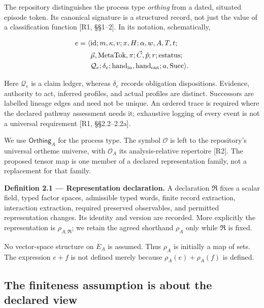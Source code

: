 \documentclass[11pt,a4paper]{article}
\begin{document}
The repository distinguishes the process type \emph{orthing} from a
dated, situated episode token. Its canonical signature is a structured
record, not just the value of a classification function {[}R1,
§§1--2{]}. In its notation, schematically,

\nopagebreak[4]

\[
\begin{aligned}
e=\langle &\mathrm{id};m,\kappa,v;x,H;\alpha,w,A,T,t;\\
&\vec\mu,\mathrm{MetaTok},\pi;\vec C,\hat p;r;\mathrm{estatus};\\
&\mathcal Q_e;\delta_e;\mathrm{hand}_{\rm in},\mathrm{hand}_{\rm out};
 a,\mathrm{Succ}\rangle.
\end{aligned}
\]

Here \(\mathcal Q_e\) is a claim ledger, whereas \(\delta_e\) records
obligation dispositions. Evidence, authority to act, inferred profiles,
and actual profiles are distinct. Successors are labelled lineage edges
and need not be unique. An ordered trace is required where the declared
pathway assessment needs it; exhaustive logging of every event is not a
universal requirement {[}R1, §§2.2--2.2a{]}.

We use \(\mathsf{Orthing}_A\) for the process type. The symbol
\(\mathcal O\) is left to the repository's universal ortheme universe,
with \(\mathcal O_A\) its analysis-relative repertoire {[}R2{]}. The
proposed tensor map is one member of a declared representation family,
not a replacement for that family.


\textbf{Definition 2.1 --- Representation declaration.} A declaration
\(\mathfrak R\) fixes a scalar field, typed factor spaces, admissible
typed words, finite record extraction, interaction extraction, required
preserved observables, and permitted representation changes. Its
identity and version are recorded. More explicitly the representation is
\(\rho_{A,\mathfrak R}\); we retain the agreed shorthand \(\rho_A\) only
while \(\mathfrak R\) is fixed.

No vector-space structure on \(E_A\) is assumed. Thus \(\rho_A\) is
initially a map of sets. The expression \(e+f\) is not defined merely
because \(\rho_A(e)+\rho_A(f)\) is defined.

\subsection{The finiteness assumption is about the declared
view}\label{the-finiteness-assumption-is-about-the-declared-view}
\end{document}
